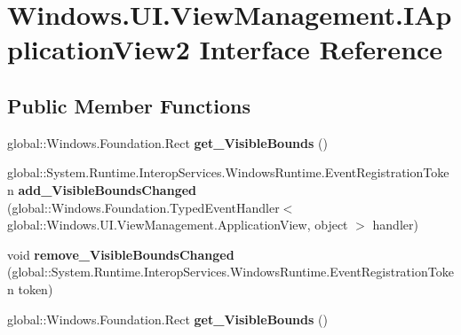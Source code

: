 \hypertarget{interface_windows_1_1_u_i_1_1_view_management_1_1_i_application_view2}{}\section{Windows.\+U\+I.\+View\+Management.\+I\+Application\+View2 Interface Reference}
\label{interface_windows_1_1_u_i_1_1_view_management_1_1_i_application_view2}
\subsection*{Public Member Functions}
\begin{DoxyCompactItemize}
\item 
\mbox{\label{interface_windows_1_1_u_i_1_1_view_management_1_1_i_application_view2_ad6db037a99c4ceb8e22771d1d3805bba}} 
global\+::\+Windows.\+Foundation.\+Rect {\bfseries get\+\_\+\+Visible\+Bounds} ()
\item 
\mbox{\label{interface_windows_1_1_u_i_1_1_view_management_1_1_i_application_view2_a6f3dd73ea0a85e796cca56ccc59508ec}} 
global\+::\+System.\+Runtime.\+Interop\+Services.\+Windows\+Runtime.\+Event\+Registration\+Token {\bfseries add\+\_\+\+Visible\+Bounds\+Changed} (global\+::\+Windows.\+Foundation.\+Typed\+Event\+Handler$<$ global\+::\+Windows.\+U\+I.\+View\+Management.\+Application\+View, object $>$ handler)
\item 
\mbox{\label{interface_windows_1_1_u_i_1_1_view_management_1_1_i_application_view2_a6edb35d942013a4377357cc35cbac9fe}} 
void {\bfseries remove\+\_\+\+Visible\+Bounds\+Changed} (global\+::\+System.\+Runtime.\+Interop\+Services.\+Windows\+Runtime.\+Event\+Registration\+Token token)
\item 
\mbox{\label{interface_windows_1_1_u_i_1_1_view_management_1_1_i_application_view2_ad6db037a99c4ceb8e22771d1d3805bba}} 
global\+::\+Windows.\+Foundation.\+Rect {\bfseries get\+\_\+\+Visible\+Bounds} ()
\item 

\end{DoxyCompactItemize}
